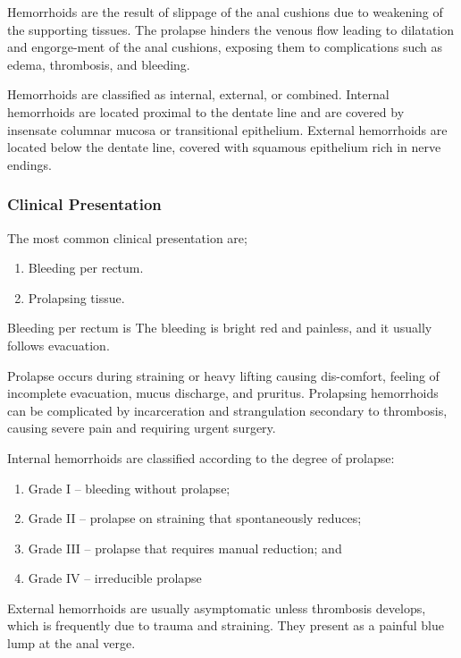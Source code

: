 \documentclass[
  letterpaper,
  DIV=11,
  numbers=noendperiod]{scrreprt}
\providecommand{\tightlist}{%
  \setlength{\itemsep}{0pt}\setlength{\parskip}{0pt}}\usepackage{longtable,booktabs,array}
\begin{document}
Hemorrhoids are the result of slippage of the anal cushions due to
weakening of the supporting tissues. The prolapse hinders the venous ﬂow
leading to dilatation and engorge-ment of the anal cushions, exposing
them to complications such as edema, thrombosis, and bleeding.

Hemorrhoids are classiﬁed as internal, external, or combined. Internal
hemorrhoids are located proximal to the dentate line and are covered by
insensate columnar mucosa or transitional epithelium. External
hemorrhoids are located below the dentate line, covered with squamous
epithelium rich in nerve endings.

\subsubsection{Clinical Presentation}\label{clinical-presentation}

The most common clinical presentation are;

\begin{enumerate}
\def\labelenumi{\arabic{enumi}.}
\tightlist
\item
  Bleeding per rectum.
\item
  Prolapsing tissue.
\end{enumerate}

Bleeding per rectum is The bleeding is bright red and painless, and it
usually follows evacuation.

Prolapse occurs during straining or heavy lifting causing dis-comfort,
feeling of incomplete evacuation, mucus discharge, and pruritus.
Prolapsing hemorrhoids can be complicated by incarceration and
strangulation secondary to thrombosis, causing severe pain and requiring
urgent surgery.

Internal hemorrhoids are classiﬁed according to the degree of prolapse:

\begin{enumerate}
\def\labelenumi{\arabic{enumi}.}
\tightlist
\item
  Grade I -- bleeding without prolapse;
\item
  Grade II -- prolapse on straining that spontaneously reduces;
\item
  Grade III -- prolapse that requires manual reduction; and
\item
  Grade IV -- irreducible prolapse
\end{enumerate}

External hemorrhoids are usually asymptomatic unless thrombosis
develops, which is frequently due to trauma and straining. They present
as a painful blue lump at the anal verge.
\end{document}
